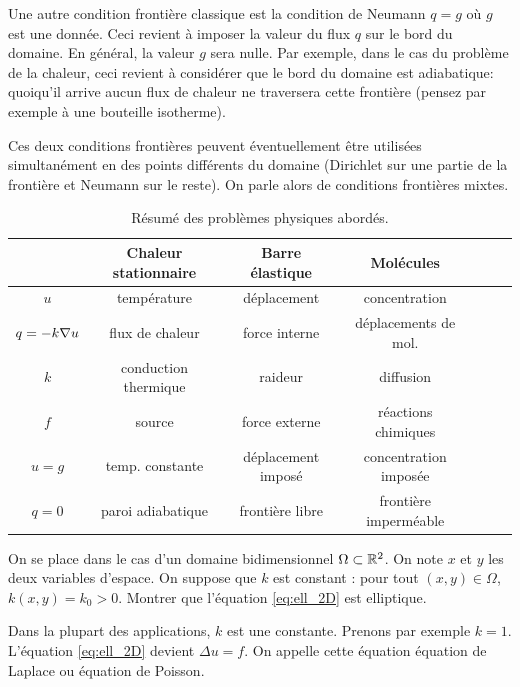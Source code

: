 \documentclass[12pt,a4paper,twoside]{article}
\begin{document}
Une autre condition fronti\`ere classique est la condition de Neumann
$q = g$ o\`u $g$ est une donn\'ee. Ceci revient \`a imposer la valeur
du flux $q$ sur le bord du domaine.
En g\'en\'eral, la valeur $g$ sera nulle.
Par exemple, dans le cas du probl\`eme de la chaleur, ceci revient
\`a consid\'erer que le bord du domaine est adiabatique:
quoiqu'il arrive aucun flux de chaleur ne traversera cette fronti\`ere
(pensez par exemple \`a une bouteille isotherme).


Ces deux conditions fronti\`eres peuvent \'eventuellement \^etre utilis\'ees 
simultan\'ement en des points diff\'erents du domaine
(Dirichlet sur une partie de la fronti\`ere et Neumann sur le reste).
On parle alors de conditions fronti\`eres mixtes.

\begin{table}[h]
  \centering
  \begin{tabular}{|c|c|c|c|c|c|c|}
    \hline
    &Chaleur stationnaire&Barre \'elastique& Mol\'ecules
    \\
    \hline
    $u$ & temp\'erature & d\'eplacement & concentration
    \\
    \hline
    $q=-k\nabla u$ & flux de chaleur & force interne & d\'eplacements de mol.
    \\
    \hline
    $k$ & conduction thermique & raideur & diffusion
    \\
    \hline
    $f$& source & force externe & r\'eactions chimiques
    \\
    \hline
    $u=g$ & temp. constante & d\'eplacement impos\'e & concentration impos\'ee
    \\
    \hline
    $q=0$ & paroi adiabatique & fronti\`ere libre & fronti\`ere imperm\'eable
    \\
    \hline
  \end{tabular}
  \caption{R\'esum\'e des probl\`emes physiques abord\'es.}
  \label{tab:pb_ell}
\end{table}


\begin{exercise}
  On se place dans le cas d'un domaine bidimensionnel $\Omega \subset \mathbb{R}^2$.
  On note $x$ et $y$ les deux variables d'espace.
  On suppose que $k$ est constant : pour tout $(x,y) \in \Omega$,
  $k(x,y) = k_0 > 0$.
  Montrer que l'\'equation \eqref{eq:ell_2D} est elliptique.
\end{exercise}

\begin{remark}
  Dans la plupart des applications, $k$ est une constante.
  Prenons par exemple $k=1$.
  L'\'equation \eqref{eq:ell_2D} devient $\Delta u = f$.
  On appelle cette \'equation \'equation de Laplace ou 
  \'equation de Poisson.
\end{remark}
\end{document}
